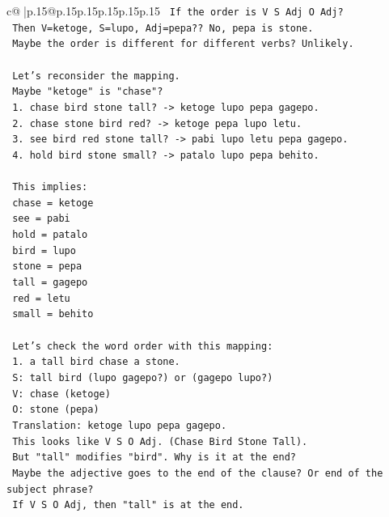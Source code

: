 \documentclass{article}
\begin{document}
{\begin{supertabular}{c@{$\;$}|p{.15\linewidth}@{}p{.15\linewidth}p{.15\linewidth}p{.15\linewidth}p{.15\linewidth}p{.15\linewidth}}
{{{\texttt{   If the order is V S Adj O Adj?} \\
\texttt{   Then V=ketoge, S=lupo, Adj=pepa?? No, pepa is stone.} \\
\texttt{   Maybe the order is different for different verbs? Unlikely.} \\
\\ 
\texttt{   Let's reconsider the mapping.} \\
\texttt{   Maybe "ketoge" is "chase"?} \\
\texttt{   1. chase bird stone tall? {-}> ketoge lupo pepa gagepo.} \\
\texttt{   2. chase stone bird red? {-}> ketoge pepa lupo letu.} \\
\texttt{   3. see bird red stone tall? {-}> pabi lupo letu pepa gagepo.} \\
\texttt{   4. hold bird stone small? {-}> patalo lupo pepa behito.} \\
\\ 
\texttt{   This implies:} \\
\texttt{   chase = ketoge} \\
\texttt{   see = pabi} \\
\texttt{   hold = patalo} \\
\texttt{   bird = lupo} \\
\texttt{   stone = pepa} \\
\texttt{   tall = gagepo} \\
\texttt{   red = letu} \\
\texttt{   small = behito} \\
\\ 
\texttt{   Let's check the word order with this mapping:} \\
\texttt{   1. a tall bird chase a stone.} \\
\texttt{      S: tall bird (lupo gagepo?) or (gagepo lupo?)} \\
\texttt{      V: chase (ketoge)} \\
\texttt{      O: stone (pepa)} \\
\texttt{      Translation: ketoge lupo pepa gagepo.} \\
\texttt{      This looks like V S O Adj. (Chase Bird Stone Tall).} \\
\texttt{      But "tall" modifies "bird". Why is it at the end?} \\
\texttt{      Maybe the adjective goes to the end of the clause? Or end of the subject phrase?} \\
\texttt{      If V S O Adj, then "tall" is at the end.} \\
}}}
\end{supertabular}}
\end{document}
